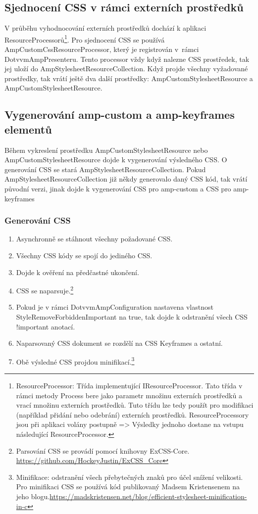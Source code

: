 \subsection*{Sjednocení CSS v rámci externích prostředků}
V průběhu vyhodnocování externích prostředků dochází k aplikaci ResourceProcessorů\footnote{ResourceProcessor: Třída implementující IResourceProcessor. Tato třída v rámci metody Process bere jako parametr množinu externích prostředků a vrací množinu externích prostředků. Tuto třídu lze tedy použít pro modifikaci (například přidání nebo odebrání) externích prostředků. ResourceProcessory jsou při aplikaci volány postupně => Výsledky jednoho dostane na vstupu následující ResourceProcessor.}. Pro sjednocení CSS se používá AmpCustomCssResourceProcessor, který je registrován v~rámci DotvvmAmpPresenteru. Tento processor vždy když nalezne CSS prostředek, tak jej uloží do AmpStylesheetResourceCollection. Když projde všechny vyžadované prostředky, tak vrátí ještě dva další prostředky: AmpCustomStylesheetResource a AmpCustomStylesheetResource.

\subsection*{Vygenerování amp-custom a amp-keyframes elementů}
Během vykreslení prostředku AmpCustomStylesheetResource nebo AmpCustomStylesheetResource dojde k vygenerování výsledného CSS. O generování CSS se stará AmpStylesheetResourceCollection. Pokud AmpStylesheetResourceCollection již někdy generovalo daný CSS kód, tak vrátí původní verzi, jinak dojde k vygenerování CSS pro amp-custom a CSS  pro amp-keyframes

\subsubsection*{Generování CSS}
\begin{enumerate}
    \item Asynchronně se stáhnout všechny požadované CSS.
    \item Všechny CSS kódy se spojí do jediného CSS.
    \item Dojde k ověření na předčastné ukončení.
    \item CSS se naparsuje.\footnote{Parsování CSS se provádí pomocí knihovny ExCSS-Core. \newline \url{https://github.com/HockeyJustin/ExCSS_Core}}
    \item Pokud je v rámci DotvvmAmpConfiguration nastavena vlastnost StyleRemoveForbiddenImportant na true, tak dojde k odstranění všech CSS !important anotací. 
    \item Naparsovaný CSS dokument se rozdělí na CSS Keyframes a ostatní.
    \item Obě výsledné CSS projdou minifikací.\footnote{Minifikace: odstranění všech přebytečných znaků pro účel snížení velikosti. \newline Pro minifikaci CSS se používá kód publikovaný Madsem Kristensenem na jeho blogu.\newline \url{https://madskristensen.net/blog/efficient-stylesheet-minification-in-c}}
\end{enumerate}

